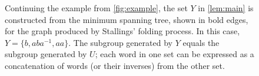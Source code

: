 \begin{figure}
  \caption{\label{fig:tree}%
    Continuing the example from \autoref{fig:example}, the set $Y$ in \autoref{lem:main} is constructed from the minimum spanning tree, shown in bold edges, for the graph produced by Stallings' folding process.
  In this case, $Y = \{b, aba^{-1}, aa\}$.
  The subgroup generated by $Y$ equals the subgroup generated by $U$; each word in one set can be expressed as a concatenation of words (or their inverses) from the other set.}
  \begin{center}
  \end{center}
\end{figure}
